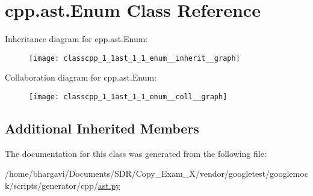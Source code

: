 \hypertarget{classcpp_1_1ast_1_1_enum}{}\section{cpp.\+ast.\+Enum Class Reference}
\label{classcpp_1_1ast_1_1_enum}


Inheritance diagram for cpp.\+ast.\+Enum\+:
\nopagebreak
\begin{figure}[H]
\begin{center}
\leavevmode
\texttt{[image: classcpp\_1\_1ast\_1\_1\_enum\_\_inherit\_\_graph]}
\end{center}
\end{figure}


Collaboration diagram for cpp.\+ast.\+Enum\+:
\nopagebreak
\begin{figure}[H]
\begin{center}
\leavevmode
\texttt{[image: classcpp\_1\_1ast\_1\_1\_enum\_\_coll\_\_graph]}
\end{center}
\end{figure}
\subsection*{Additional Inherited Members}


The documentation for this class was generated from the following file\+:\begin{DoxyCompactItemize}
\item 
/home/bhargavi/\+Documents/\+S\+D\+R/\+Copy\+\_\+\+Exam\+\_\+X/vendor/googletest/googlemock/scripts/generator/cpp/\hyperlink{ast_8py}{ast.\+py}\end{DoxyCompactItemize}
